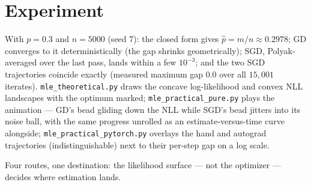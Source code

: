 \documentclass[11pt]{article}
\begin{document}
\section{Experiment}

With $p = 0.3$ and $n = 5000$ (seed 7): the closed form gives
$\hat{p} = m/n \approx 0.2978$; GD converges to it deterministically (the
gap shrinks geometrically); SGD, Polyak-averaged over the last pass, lands
within a few $10^{-3}$; and the two SGD trajectories coincide exactly
(measured maximum gap $0.0$ over all $15{,}001$ iterates).
\texttt{mle\_theoretical.py} draws the concave log-likelihood and convex
NLL landscapes with the optimum marked; \texttt{mle\_practical\_pure.py}
plays the animation --- GD's bead gliding down the NLL while SGD's bead
jitters into its noise ball, with the same progress unrolled as an
estimate-versus-time curve alongside; \texttt{mle\_practical\_pytorch.py}
overlays the hand and autograd trajectories (indistinguishable) next to
their per-step gap on a log scale.

Four routes, one destination: the likelihood surface --- not the
optimizer --- decides where estimation lands.
\end{document}
